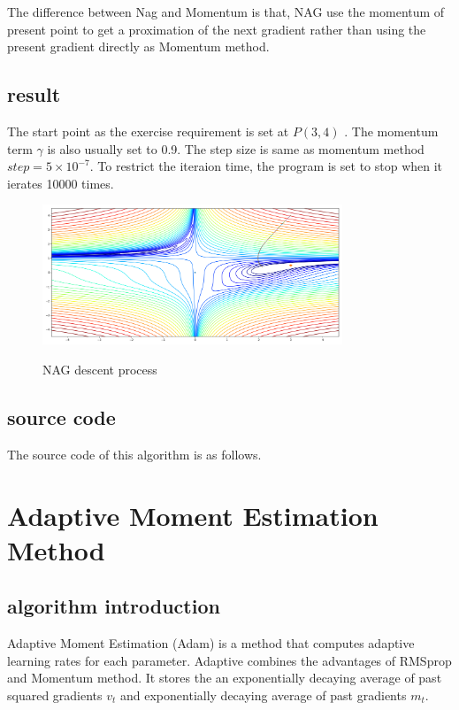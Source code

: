 \documentclass[aps,letterpaper,10pt]{article}
\begin{document}
The difference between Nag and Momentum is that,  NAG use the momentum of present point to get a proximation of the next gradient rather than using the present gradient directly as Momentum method.


\subsection{result}
The start point as the exercise requirement is set at $P(3,4)$ . The momentum term $\gamma$ is also usually set to 0.9. The step size is same as momentum method $step = 5\times10^{-7}$. To restrict the iteraion time, the program is set to stop when it ierates 10000 times.

  \begin{figure}[H]
    \centering
    \label{fig:nag}\includegraphics[width=0.8\textwidth]{nag.png}\
    \caption{NAG descent process}
  \end{figure}

\subsection{source code}
The source code of this algorithm is as follows.  \vspace{5mm}
  
	\vspace{3mm}


\newpage
\section{Adaptive Moment Estimation Method}
  \subsection{algorithm introduction}
  Adaptive Moment Estimation (Adam) is a method that computes adaptive learning rates for each parameter. Adaptive combines the advantages of RMSprop and Momentum method. It stores the an exponentially decaying average of past squared gradients $v_t$ and exponentially decaying average of past gradients $m_t$. \vspace{3mm}
\end{document}
